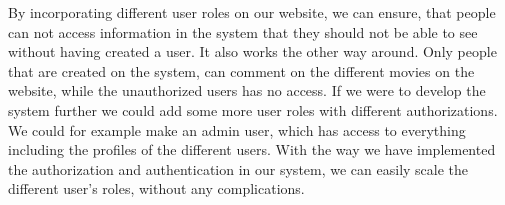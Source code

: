 By incorporating different user roles on our website, we can
ensure, that people can not access
information in the system that they should not be
able to see without having created a user.
It also works the other way around. Only people
that are created on the system, can comment on the
different movies on the website, while the unauthorized users has no access. If
we were to develop the system further we could add
some more user roles with different authorizations.
We could for example make an admin user, which has access
to everything including the profiles of the different
users. With the way we have implemented the
authorization and authentication in our system, we
can easily scale the different user's roles, without any
complications.\newline


